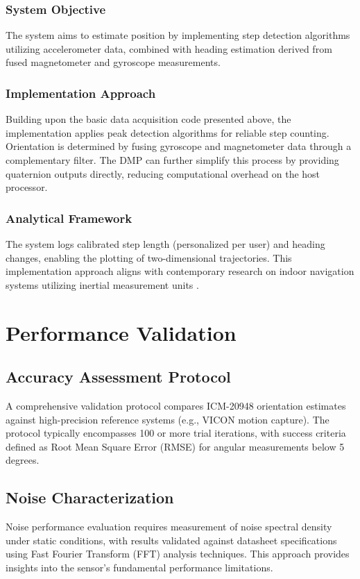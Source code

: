 \subsubsection{System Objective}
The system aims to estimate position by implementing step detection algorithms utilizing accelerometer data, combined with heading estimation derived from fused magnetometer and gyroscope measurements.

\subsubsection{Implementation Approach}
Building upon the basic data acquisition code presented above, the implementation applies peak detection algorithms for reliable step counting. Orientation is determined by fusing gyroscope and magnetometer data through a complementary filter. The DMP can further simplify this process by providing quaternion outputs directly, reducing computational overhead on the host processor.

\subsubsection{Analytical Framework}
The system logs calibrated step length (personalized per user) and heading changes, enabling the plotting of two-dimensional trajectories. This implementation approach aligns with contemporary research on indoor navigation systems utilizing inertial measurement units \cite{Bistrov:2012}.

\section{Performance Validation}
\subsection{Accuracy Assessment Protocol}
A comprehensive validation protocol compares ICM-20948 orientation estimates against high-precision reference systems (e.g., VICON motion capture). The protocol typically encompasses 100 or more trial iterations, with success criteria defined as Root Mean Square Error (RMSE) for angular measurements below 5 degrees.

\subsection{Noise Characterization}
Noise performance evaluation requires measurement of noise spectral density under static conditions, with results validated against datasheet specifications using Fast Fourier Transform (FFT) analysis techniques. This approach provides insights into the sensor's fundamental performance limitations.

